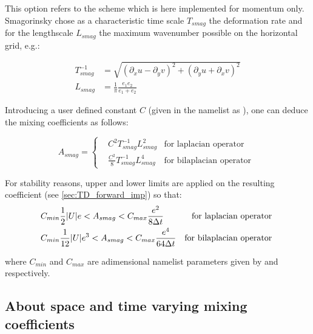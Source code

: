 \documentclass[../main/NEMO_manual]{subfiles}
\begin{document}
This option refers to the \citep{smagorinsky_MW63} scheme which is here implemented for momentum only. Smagorinsky chose as a
characteristic time scale $T_{smag}$ the deformation rate and for the lengthscale $L_{smag}$ the maximum wavenumber possible on the horizontal grid, e.g.:

\begin{equation}
  \label{eq:LDF_smag1}
  \begin{split}
    T_{smag}^{-1} & = \sqrt{\left( \partial_x u - \partial_y v\right)^2 + \left( \partial_y u + \partial_x v\right)^2  } \\
    L_{smag} & = \frac{1}{\pi}\frac{e_1 e_2}{e_1 + e_2}
  \end{split}
\end{equation}

Introducing a user defined constant $C$ (given in the namelist as ), one can deduce the mixing coefficients as follows:

\begin{equation}
  \label{eq:LDF_smag2}
  A_{smag} = \left\{
    \begin{aligned}
      & C^2  T_{smag}^{-1}  L_{smag}^2			& \text{for laplacian operator } \\
      & \frac{C^2}{8} T_{smag}^{-1} L_{smag}^4     	& \text{for bilaplacian operator }
    \end{aligned}
  \right.
\end{equation}

For stability reasons, upper and lower limits are applied on the resulting coefficient (see \autoref{sec:TD_forward_imp}) so that:
\begin{equation}
  \label{eq:LDF_smag3}
    \begin{aligned}
      & C_{min} \frac{1}{2}   \lvert U \rvert  e    < A_{smag} < C_{max} \frac{e^2}{   8\Delta t}                 & \text{for laplacian operator } \\
      & C_{min} \frac{1}{12} \lvert U \rvert  e^3 < A_{smag} < C_{max} \frac{e^4}{64 \Delta t}                 & \text{for bilaplacian operator }
    \end{aligned}
\end{equation}

where $C_{min}$ and $C_{max}$ are adimensional namelist parameters given by  and  respectively.

\subsection{About space and time varying mixing coefficients}
\end{document}
